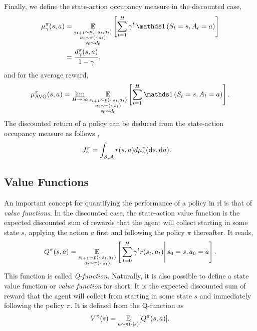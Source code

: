Finally, we define the state-action occupancy measure \cite{laroche2022non} in the discounted case,
\begin{align*}
    \discountedstateoccupancymeasure[\gamma] (s,a) &= \expectedvalue_{\substack{s_{t+1}\sim p(\cdot\vert s_t,a_t)\\a_t\sim\pi(\cdot\vert s_t)\\s_0\sim \initialstatedistribution}}\left[\sum_{t=1}^H \gamma^t \Ind\left(S_t=s, A_t=a\right)\right]
    \\
    &= \frac{\discountedstateoccupancydistribution[\gamma] (s,a)}{1-\gamma},
\end{align*}
and for the average reward,
\begin{align*}
    \averagestateoccupancymeasure[\pi] (s,a) = \lim_{H\rightarrow \infty}\expectedvalue_{\substack{s_{t+1}\sim p(\cdot\vert s_t,a_t)\\a_t\sim\pi(\cdot\vert s_t)\\s_0\sim \initialstatedistribution}}\left[\sum_{t=1}^H \Ind\left(S_t=s, A_t=a\right)\right].
\end{align*}
The discounted return of a policy can be deduced from the state-action occupancy measure as follows \cite[Lemma~1]{laroche2022non},
\begin{align*}
    \expectedreturn[\gamma] &= \int_{\statespace,\actionspace} r(s,a)d\discountedstateoccupancymeasure[\gamma]  (\de s,\de a).
\end{align*}

\subsection{Value Functions}
An important concept for quantifying the performance of a policy in \gls{rl} is that of \emph{value functions}. 
In the discounted case, the state-action value function is the expected discounted sum of rewards that the agent will collect starting in some state $s$, applying the action $a$ first and following the policy $\pi$ thereafter. 
It reads,
\begin{align}
    Q^\pi(s,a) = \operatorname*{\mathbb{E}}_{\substack{s_{t+1}\sim p(\cdot\vert s_t,a_t)\\a_t\sim\pi(\cdot\vert s_t)}}
    \left[\left.\sum_{t=0}^H \gamma^t r(s_t,a_t)\right\vert s_0=s, a_0=a\right].\label{eq:state_action_value_function}
\end{align}
This function is called \emph{Q-function}.
Naturally, it is also possible to define a state value function or \emph{value function} for short. 
It is the expected discounted sum of reward that the agent will collect from starting in some state $s$ and immediately following the policy $\pi$.
It is defined from the Q-function as
\begin{align*}
    V^\pi(s)=\operatorname*{\mathbb{E}}_{a\sim\pi(\cdot\vert s)}[Q^\pi(s,a)].
\end{align*}

